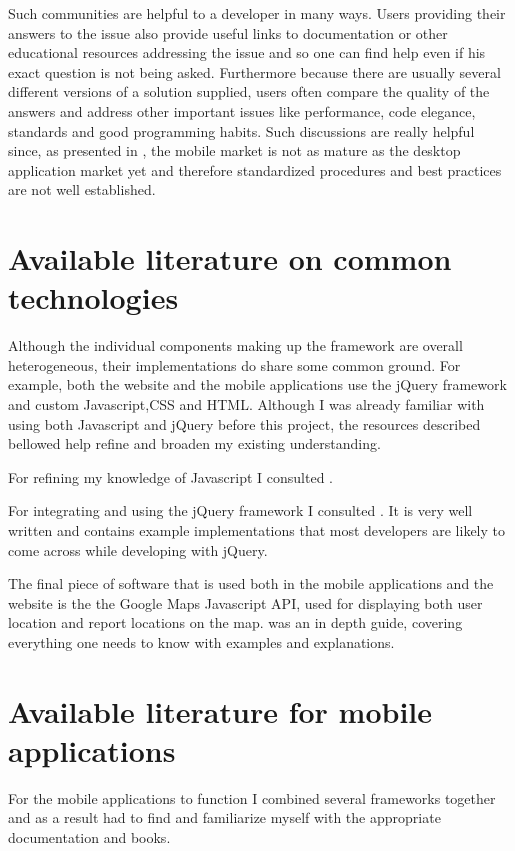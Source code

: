 \documentclass[12pt]{ecsproject}     %
\begin{document}
Such communities are helpful to a developer in many ways. Users providing their answers to the issue also provide useful links to documentation or other educational resources addressing the issue and so one can find help even if his exact question is not being asked. Furthermore because there are usually several different versions of a solution supplied, users often compare the quality of the answers and address other important issues like performance, code elegance, standards and good programming habits. Such discussions are really helpful since, as presented in \citet{ken}, the mobile market is not as mature as the desktop application market yet and therefore standardized procedures and best practices are not well established.

\section{Available literature on common technologies}
Although the individual components making up the framework are overall heterogeneous, their implementations do share some common ground. For example, both the website and the mobile applications use the jQuery framework and custom Javascript,CSS and HTML. Although I was already familiar with using both Javascript and jQuery before this project, the resources described bellowed help refine and broaden my existing understanding.

For refining my knowledge of Javascript I consulted \citet{jsninja}.

For integrating and using the jQuery framework I consulted \cite{jqdocs}. It is very well written and contains example implementations that most developers are likely to come across while developing with jQuery.

The final piece of software that is used both in the mobile applications and the website is the the Google Maps Javascript API, used for displaying both user location and report locations on the map. \citep{mapsdocs} was an in depth guide, covering everything one needs to know with examples and explanations.

\section{Available literature for mobile applications}
For the mobile applications to function I combined several frameworks together and as a result had to find and familiarize myself with the appropriate documentation and books.
\end{document}
